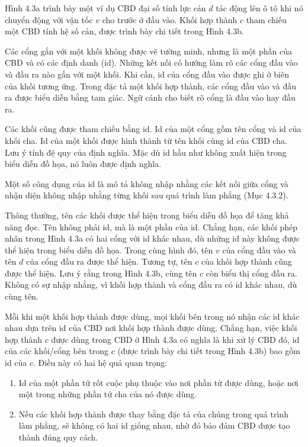 Hình 4.3a trình bày một ví dụ CBD đại số tính lực cản $d$ tác động lên ô tô khi nó chuyển động với vận tốc $v$ cho trước ở đầu vào. Khối hợp thành $c$ tham chiếu một CBD tính hệ số cản, được trình bày chi tiết trong Hình 4.3b.

Các cổng gắn với một khối không được vẽ tường minh, nhưng là một phần của CBD và có các định danh (id). Những kết nối có hướng làm rõ các cổng đầu vào và đầu ra nào gắn với một khối. Khi cần, id của cổng đầu vào được ghi ở biên của khối tương ứng. Trong đặc tả một khối hợp thành, các cổng đầu vào và đầu ra được biểu diễn bằng tam giác. Ngữ cảnh cho biết rõ cổng là đầu vào hay đầu ra.

Các khối cũng được tham chiếu bằng id. Id của một cổng gồm tên cổng và id của khối cha. Id của một khối được hình thành từ tên khối cùng id của CBD cha. Lưu ý tính đệ quy của định nghĩa. Mặc dù id hầu như không xuất hiện trong biểu diễn đồ họa, nó luôn được định nghĩa.

Một số công dụng của id là mô tả không nhập nhằng các kết nối giữa cổng và nhận diện không nhập nhằng từng khối sau quá trình làm phẳng (Mục 4.3.2).

Thông thường, tên các khối được thể hiện trong biểu diễn đồ họa để tăng khả năng đọc. Tên không phải id, mà là một phần của id. Chẳng hạn, các khối phép nhân trong Hình 4.3a có hai cổng với id khác nhau, dù những id này không được thể hiện trong biểu diễn đồ họa. Trong cùng hình đó,
tên $v$ của cổng đầu vào và tên $d$ của cổng đầu ra được thể hiện. Tương tự, tên $c$ của khối hợp thành cũng được thể hiện. Lưu ý rằng trong Hình 4.3b, cùng tên $c$ còn biểu thị cổng đầu ra. Không có sự nhập nhằng, vì khối hợp thành và cổng đầu ra có id khác nhau, dù cùng tên.

Mỗi khi một khối hợp thành được dùng, mọi khối bên trong nó nhận các id khác nhau dựa trên id của CBD nơi khối hợp thành được dùng. Chẳng hạn, việc khối hợp thành $c$ được dùng trong CBD ở Hình 4.3a có nghĩa là khi xử lý CBD đó, id của các khối/cổng bên trong $c$ (được trình bày chi tiết trong Hình 4.3b) bao gồm id của $c$. Điều này có hai hệ quả quan trọng:
\begin{enumerate}
\item Id của một phần tử rốt cuộc phụ thuộc vào nơi phần tử được dùng, hoặc nơi một trong những phần tử cha của nó được dùng.
\item Nếu các khối hợp thành được thay bằng đặc tả của chúng trong quá trình làm phẳng, sẽ không có hai id giống nhau, nhờ đó bảo đảm CBD được tạo thành đúng quy cách.
\end{enumerate}

